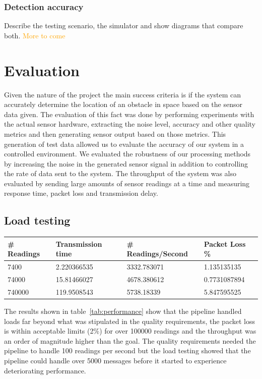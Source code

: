 \documentclass[prodmode,acmtosem]{acmsmall} %
\begin{document}
\subsubsection{Detection accuracy}
Describe the testing scenario, the simulator and show diagrams that compare both.
\textcolor{orange}{More to come}


\section{Evaluation}
Given the nature of the project the main success criteria is if the system can accurately determine the location of an obstacle in space based on the sensor data given. The evaluation of this fact was done by performing experiments with the actual sensor hardware, extracting the noise level, accuracy and other quality metrics and then generating sensor output based on those metrics. This generation of test data allowed us to evaluate the accuracy of our system in a controlled environment. We evaluated the robustness of our processing methods by increasing the noise in the generated sensor signal in addition to controlling the rate of data sent to the system. The throughput of the system was also evaluated by sending large amounts of sensor readings at a time and measuring response time, packet loss and transmission delay.

\subsection{Load testing}

\begin{center}
\begin{tabularx}{\textwidth}{| X | X | X | X |} 
\hline
\# Readings & Transmission time & \# Readings/Second & Packet Loss \% \\
\hline
7400 & 2.220366535 & 3332.783071 & 1.135135135 \\
\hline
74000 & 15.81466027 & 4678.380612 & 0.7731087894 \\
\hline
740000 & 119.9508543 & 5738.18339 & 5.847595525 \\
\hline
\end{tabularx}
\label{tab:performance}
\end{center}

The results shown in table~\ref{tab:performance} show that the pipeline handled loads far beyond what was stipulated in the quality requirements, the packet loss is within acceptable limits (2\%) for over 100000 readings and the throughput was an order of magnitude higher than the goal. The quality requirements needed the pipeline to handle 100 readings per second but the load testing showed that the pipeline could handle over 5000 messages before it started to experience deteriorating performance.
\end{document}
